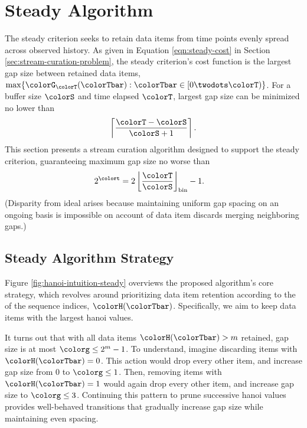 \section{Steady Algorithm} \label{sec:steady}

The steady criterion seeks to retain data items from time points evenly spread across observed history.
As given in Equation \ref{eqn:steady-cost} in Section \ref{sec:stream-curation-problem}, the steady criterion's cost function is the largest gap size between retained data items, $\max\{\colorG_{\colorT}(\colorTbar) : \colorTbar \in [0 \twodots \colorT)\}$.
For a buffer size $\colorS$ and time elapsed $\colorT$, largest gap size can be minimized no lower than
\begin{align}
\left\lceil
\frac{\colorT - \colorS}{\colorS + 1}
\right\rceil.
\label{eqn:steady-optimal-gap-size}
\end{align}
This section presents a stream curation algorithm designed to support the steady criterion, guaranteeing maximum gap size no worse than
\begin{align*}
2^{\colort}
&= 2 \left\lfloor \frac{\colorT}{\colorS} \right\rfloor_{\mathrm{bin}} - 1.
\end{align*}
(Disparity from ideal arises because maintaining uniform gap spacing on an ongoing basis is impossible on account of data item discards merging neighboring gaps.)

\subsection{Steady Algorithm Strategy}
\label{sec:steady-strategy}

Figure \ref{fig:hanoi-intuition-steady} overviews the proposed algorithm's core strategy, which revolves around prioritizing data item retention according to the \hv{} of the sequence indices, $\colorH(\colorTbar)$.
Specifically, we aim to keep data items with the largest hanoi values.

It turns out that with all data items $\colorH(\colorTbar) > m$ retained, gap size is at most $\colorg \leq 2^m - 1$.
To understand, imagine discarding items with $\colorH(\colorTbar) = 0$.
This action would drop every other item, and increase gap size from 0 to $\colorg \leq 1$.
Then, removing items with $\colorH(\colorTbar) = 1$ would again drop every other item, and increase gap size to $\colorg \leq 3$.
Continuing this pattern to prune successive hanoi values provides well-behaved transitions that gradually increase gap size while maintaining even spacing.

